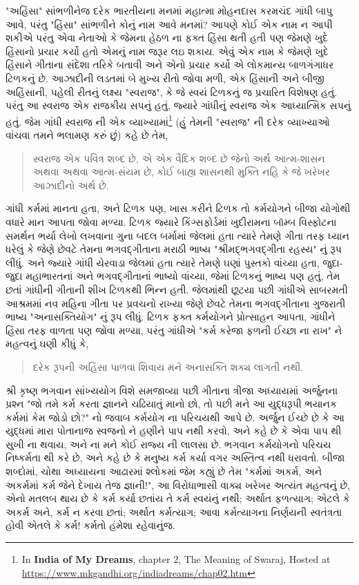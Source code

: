 \documentclass[a4paper]{article}
\begin{document}
\begin{Guja}
"અહિંસા" સાંભળીનેજ દરેક ભારતીયના મનમાં મહાત્મા મોહનદાસ કરમચંદ ગાંધી બાપુ આવે, પરંતુ "હિંસા" સાંભળીને કોનું નામ આવે મનમાં? આપણે કોઈ એક નામ ન આપી 
શકીએ પરંતુ એવા નેતાઓ કે જેમના હેઠળ ના ફક્ત હિંસા થતી હતી પણ જેમણે ખુદે હિંસાનો પ્રચાર કર્યો હતો એમનું નામ જરૂર લઇ શકાય. એવું એક નામ કે જેમણે ખુદે 
હિંસાને ગીતાના સંદેશા તરિકે બતાવી અને એનો પ્રચાર કર્યો એ લોકમાન્ય બાળગંગાધર ટિળકનું છે. આઝાદીની લડતમાં બે મુખ્ય રીતો જોવા મળી, એક હિંસાની અને બીજી 
અહિંસાની, પહેલી રીતનું લક્ષ્ય "સ્વરાજ", કે જે સ્વયં ટિળકનું જ પ્રચારિત વિશેષણ હતું. પરંતુ આ સ્વરાજ એક રાજકીય સપનું હતું, જ્યારે ગાંધીનું સ્વરાજ 
એક આધ્યાત્મિક સપનું હતું. જેમ ગાંધી સ્વરાજ ની એક 
વ્યાખ્યામાં\footnote{In \textbf{India of My Dreams}, chapter 2, The Meaning of Swaraj, 
Hosted at \href{https://www.mkgandhi.org/indiadreams/chap02.htm}{https://www.mkgandhi.org/indiadreams/chap02.htm}
} 
(હું તેમની "સ્વરાજ" ની દરેક વ્યાખ્યાઓ વાંચવા તમને ભલામણ કરું છું) કહે છે તેમ,
\begin{quote}
સ્વરાજ એક પવિત્ર શબ્દ છે, એ એક વૈદિક શબ્દ છે જેનો અર્થ આત્મ-શાસન અથવા અથવા આત્મ-સંયમ છે, કોઈ બાહ્ય શાસનથી મુક્તિ નહિ કે જે ખરેખર આઝાદીનો અર્થ છે.
\end{quote}
ગાંધી કર્મમાં માનતા હતા, અને ટિળક પણ, ખાસ કરીને ટિળક તો કર્મયોગને બીજા યોગોથી વધારે માન આપતા જોવા મળ્યા. ટિળક જ્યારે કિંગ્સફોર્ડમાં ખુદીરામના બૉમ્બ 
વિસ્ફોટના સમર્થન ભર્યા લેખો લખવાના ગુના બદલ બર્મામાં જેલમાં હતા ત્યારે તેમણે ગીતા તરફ ધ્યાન ધરેલું કે જેણે છેવટે તેમના ભગવદ્ગીતાના મરાઠી ભાષ્ય "શ્રીમદ્ભગવદ્ગીતા 
રહસ્ય" નું રૂપ લીધું. અને જ્યારે ગાંધી યેરવાડા જેલમાં હતા ત્યારે તેમણે ઘણાં પુસ્તકો વાંચ્યા હતા, જુદા-જુદા મહાભારતનાં અને ભગવદ્ગીતાનાં ભાષ્યો વાંચ્યા, જેમાં ટિળકનું 
ભાષ્ય પણ હતું, તેમ છતાં ગાંધીની ગીતાની શીખ ટિળકથી ભિન્ન હતી. જેલમાંથી છૂટયા પછી  ગાંધીએ સાબરમતી આશ્રમમાં નવ મહિના ગીતા પર પ્રવચનો રાખ્યા જેણે છેવટે 
તેમના ભગવદ્ગીતાના ગુજરાતી ભાષ્ય "અનાસક્તિયોગ" નું રૂપ લીધું. ટિળક ફક્ત કર્મયોગને પ્રોત્સાહન આપતા, ગાંધીને હિંસા તરફ વાળતા પણ જોવા મળ્યા, પરંતુ 
ગાંધીએ "કર્મ કરેજા ફળની ઈચ્છા ના રાખ" ને મહત્વનું ઘણી કીધું કે,
\begin{quote}
દરેક રૂપની અહિંસા પાળવા શિવાય મને અનાસક્તિ શક્ય લાગતી નથી.
\end{quote}

શ્રી કૃષ્ણ ભગવાન સાંખ્યયોગ વિશે સમજાવ્યા પછી ગીતાના ત્રીજા અધ્યાયમાં અર્જુનના પ્રશ્ન "જો તમે કર્મ કરતા જ્ઞાનને ચઢિયાતું માનો છો, તો પછી મને આ યુદ્ધરૂપી ભયાનક 
કર્મમાં કેમ જોડો છો?" નો જવાબ કર્મયોગ ના પરિચયથી આપે છે. અર્જુન ઈચ્છે છે કે આ યુદ્ધમાં મારા પોતાનાજ સ્વજનો ને હણીને પાપ નથી કરવો, અને કહે છે કે એવા પાપ થી સુખી ના થવાય, અને ના મને કોઈ 
રાજ્ય ની લાલસા છે. ભગવાન કર્મયોગનો પરિચય નિષ્કર્મતા થી કરે છે, અને કહે છે કે મનુષ્ય કર્મ કર્યા વગર અસ્તિત્વ નથી ધરાવતો. બીજા શબ્દોમાં, ચોથા અધ્યાયના આઢારમાં શ્લોકમાં જેમ કહ્યું છે તેમ "કર્મમાં અકર્મ, 
અને અકર્મમાં કર્મ જેને દેખાય તેજ જ્ઞાની!", આ વિરોધાભાસી વાક્ય ખરેખર અત્યંત મહત્વનું છે, એનો મતલબ થાય છે કે કર્મ કર્યા છતાંય તે કર્મ સ્વયંનું નથી; અર્થાત ફળત્યાગ; એટલે કે અકર્મ અને, કર્મ ન કરવા છતાં; 
અર્થાત કર્મત્યાગ; આવા કર્મત્યાગના નિર્ણયની સ્વતંત્રતા હોવી એતલે કે કર્મ! કર્મતો હંમેશા રહેવાનુંજ.


\end{Guja}
\end{document}
